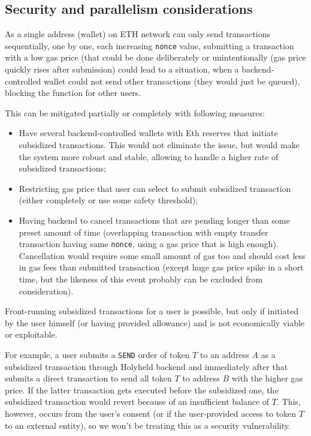 \documentclass[12pt]{article}
\begin{document}
\subsection{Security and parallelism considerations}


As a single address (wallet) on ETH network can only send transactions sequentially, one by one, each increasing \texttt{nonce} value, submitting a transaction with a low gas price (that could be done deliberately or unintentionally (gas price quickly rises after submission) could lead to a situation, when a backend-controlled wallet could not send other transactions (they would just be queued), blocking the function for other users.

This can be mitigated partially or completely with following measures:
\begin{itemize}
\item Have several backend-controlled wallets with Eth reserves that initiate subsidized transactions. This would not eliminate the issue, but would make the system more robust and stable, allowing to handle a higher rate of subsidized transactions;
\item Restricting gas price that user can select to submit subsidized transaction (either completely or use some safety threshold);
\item Having backend to cancel transactions that are pending longer than some preset amount of time (overlapping transaction with empty transfer transaction having same \texttt{nonce}, using a gas price that is high enough). Cancellation would require some small amount of gas too and should cost less in gas fees than submitted transaction (except huge gas price spike in a short time, but the likeness of this event probably can be excluded from consideration).
\end{itemize}

Front-running subsidized transactions for a user is possible, but only if initiated by the user himself (or having provided allowance) and is not economically viable or exploitable.

For example, a user submits a \texttt{SEND} order of token $T$ to an address $A$ as a subsidized transaction through Holyheld backend and immediately after that submits a direct transaction to send all token $T$ to address $B$ with the higher gas price. If the latter transaction gets executed before the subsidized one, the subsidized transaction would revert because of an insufficient balance of $T$. This, however, occurs from the user's consent (or if the user-provided access to token $T$ to an external entity), so we won't be treating this as a security vulnerability.
\end{document}
